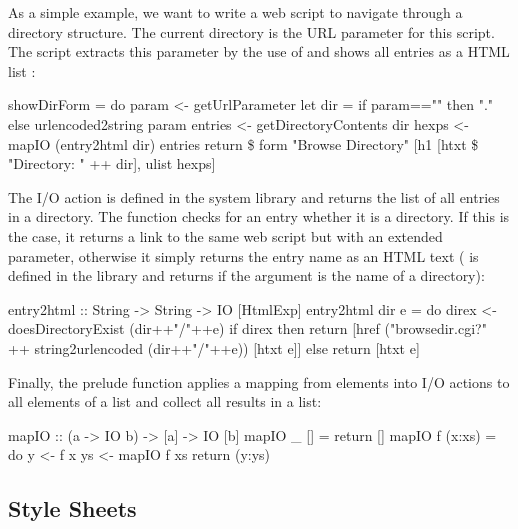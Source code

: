 As a simple example, we want to write a web script to navigate
through a directory structure. The current directory
is the URL parameter for this script. The script
extracts this parameter by the use of 
and shows all entries as a HTML list
:
\begin{prog}
showDirForm = do
  param <- getUrlParameter
  let dir = if param=="" then "." else urlencoded2string param
  entries <- getDirectoryContents dir
  hexps <- mapIO (entry2html dir) entries
  return \$ form "Browse Directory"
                [h1 [htxt \$ "Directory: " ++ dir], ulist hexps]
\end{prog}
The I/O action 
is defined in the system library 
and returns the list of all entries in a directory.
The function  checks for an entry whether it
is a directory. If this is the case, it returns a link to
the same web script but with an extended parameter, otherwise
it simply returns the entry name as an HTML text
(
is defined in the library  and returns 
if the argument is the name of a directory):
\begin{prog}
entry2html :: String -> String -> IO [HtmlExp]
entry2html dir e = do
  direx <- doesDirectoryExist (dir++"/"++e)
  if direx
   then return [href ("browsedir.cgi?" ++ string2urlencoded (dir++"/"++e))
                     [htxt e]]
   else return [htxt e]
\end{prog}
Finally, the prelude function  applies
a mapping from elements into I/O actions to all elements of a list
and collect all results in a list:
\begin{prog}
mapIO :: (a -> IO b) -> [a] -> IO [b]
mapIO _ []     = return []
mapIO f (x:xs) = do
  y  <- f x
  ys <- mapIO f xs
  return (y:ys)
\end{prog}


\subsection{Style Sheets}



